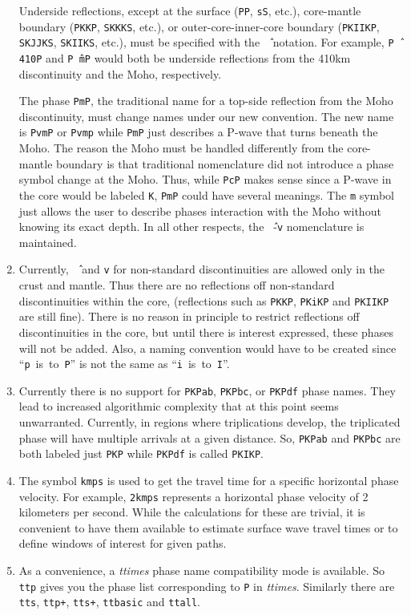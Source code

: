 \begin{enumerate}
Underside reflections, except at the 
surface (\texttt{PP}, \texttt{sS}, etc.), 
core-mantle boundary (\texttt{PKKP}, \texttt{SKKKS}, etc.), or 
outer-core-inner-core boundary (\texttt{PKIIKP}, \texttt{SKJJKS}, 
\texttt{SKIIKS}, etc.), must 
be specified with the \texttt{\^\,} notation. 
For example, \texttt{P\^\,410P} and 
\texttt{P\^\,mP} would both be underside 
reflections from the 410km discontinuity and the Moho, respectively.

The phase \texttt{PmP}, the traditional name for a top-side reflection from the Moho
discontinuity, must change names under our new convention.  
The new name is \texttt{PvmP} or \texttt{Pvmp} 
while \texttt{PmP} just describes a P-wave that turns beneath the Moho.
The reason the Moho must be handled differently from the core-mantle boundary is that
traditional nomenclature did not introduce a phase symbol change at the Moho.
Thus, while \texttt{PcP} makes sense since a P-wave in the core would be labeled
\texttt{K}, \texttt{PmP} could have several meanings.
The \texttt{m} symbol just allows the user to describe phases interaction with the Moho
without knowing its exact depth.  
In all other respects, the \texttt{\^\,}-\texttt{v} nomenclature is maintained.

\item 
Currently, \texttt{\^\,} and \texttt{v} for non-standard
discontinuities are allowed only in 
the crust and mantle. Thus there are no reflections off non-standard
discontinuities within the core, (reflections such as \texttt{PKKP}, 
\texttt{PKiKP} and \texttt{PKIIKP} are
still fine). 
There is no 
reason in principle to restrict reflections off discontinuities in the
core, but until there is interest expressed, these phases will not be added.
Also, a naming convention would have to be created since 
``\texttt{p}~is~to~\texttt{P}'' is not the same as 
``\texttt{i}~is~to~\texttt{I}''.

\item Currently there is no support for \texttt{PKPab}, \texttt{PKPbc}, 
or \texttt{PKPdf} phase names. 
They lead to increased algorithmic complexity that at this point seems 
unwarranted.
Currently, in regions where triplications develop, the triplicated phase will have multiple
arrivals at a given distance.
So, \texttt{PKPab} and \texttt{PKPbc} are
both labeled just \texttt{PKP} while \texttt{PKPdf} is called \texttt{PKIKP}.

\item \label{kmps} 
The symbol \texttt{kmps} is used to get the travel time for a
specific horizontal phase velocity.  
For example, \texttt{2kmps} represents a horizontal phase
velocity of 2 kilometers per second. 
While the calculations for these are trivial, it is convenient
to have them available to estimate surface wave travel times or to define windows of
interest for given paths.

\item As a convenience, a \textit{ttimes} phase name compatibility mode is available. 
So \texttt{ttp} gives
you the phase list corresponding to \texttt{P} in \textit{ttimes}. 
Similarly there are \texttt{tts}, \texttt{ttp+}, 
\texttt{tts+}, \texttt{ttbasic} and \texttt{ttall}.

\end{enumerate}
